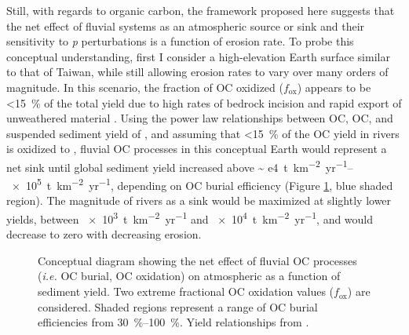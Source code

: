 Still, with regards to organic carbon, the framework proposed here suggests that the net effect of fluvial systems as an atmospheric  source or sink and their sensitivity to \textit{p} perturbations is a function of erosion rate. To probe this conceptual understanding, first I consider a high-elevation Earth surface similar to that of Taiwan, while still allowing erosion rates to vary over many orders of magnitude. In this scenario, the fraction of OC oxidized ($f_{\text{ox}}$) appears to be \SI{<15}{\%} of the total yield due to high rates of bedrock incision and rapid export of unweathered material \citep{Hilton:2011jw}. Using the power law relationships between OC, OC, and suspended sediment yield of \citet{Galy:2015fx}, and assuming that \SI{<15}{\%} of the OC yield in rivers is oxidized to , fluvial OC processes in this conceptual Earth would represent a net  sink until global sediment yield increased above \SIrange{~ e4}{e5}{t.km^{-2}.yr^{-1}}, depending on OC burial efficiency (Figure \ref{Ch7Fig:2}, blue shaded region). The magnitude of rivers as a  sink would be maximized at slightly lower yields, between \SI{e3}{t.km^{-2}.yr^{-1}} and \SI{e4}{t.km^{-2}.yr^{-1}}, and would decrease to zero with decreasing erosion.

\begin{figure}[h]
	\caption[Riverine  source/sink as a function of sediment yield]{Conceptual diagram showing the net effect of fluvial OC processes (\textit{i.e.} OC burial, OC oxidation) on atmospheric  as a function of sediment yield. Two extreme fractional OC oxidation values ($f_{\text{ox}}$) are considered. Shaded regions represent a range of OC burial efficiencies from \SIrange{30}{100}{\%}. Yield relationships from \citet{Galy:2015fx}.}
	\label{Ch7Fig:2}
\end{figure}

